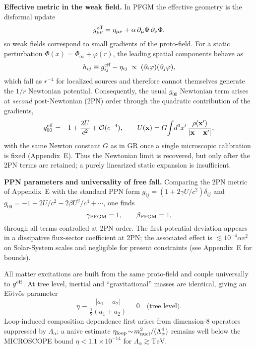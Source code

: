 \documentclass{article}
\begin{document}
\medskip
\noindent\textbf{Effective metric in the weak field.}
In PFGM the effective geometry is the disformal update
\begin{equation}
g^{\rm eff}_{\mu\nu} = \eta_{\mu\nu} + \alpha\,\partial_\mu\Phi\,\partial_\nu\Phi ,
\label{eq:weak_geff_again}
\end{equation}
so weak fields correspond to small gradients of the proto-field. For a static perturbation $\Phi(x)=\Phi_\infty+\varphi(r)$, the leading spatial components behave as
\begin{equation}
h_{ij} \equiv g^{\rm eff}_{ij}-\eta_{ij} \;\propto\; (\partial_i\varphi)(\partial_j\varphi),
\label{eq:hij_weak}
\end{equation}
which fall as $r^{-4}$ for localized sources and therefore cannot themselves generate the $1/r$ Newtonian potential. Consequently, the usual $g_{00}$ Newtonian term arises at \emph{second} post-Newtonian (2PN) order through the quadratic contribution of the gradients,
\begin{equation}
g^{\rm eff}_{00} = -1 + \frac{2U}{c^2} + \mathcal{O}(c^{-4}),
\qquad
U(\mathbf{x}) = G \!\int\! d^3x'\,\frac{\rho(\mathbf{x}')}{|\mathbf{x}-\mathbf{x}'|},
\label{eq:g00_Newtonian}
\end{equation}
with the same Newton constant $G$ as in GR once a single microscopic calibration is fixed (Appendix~E). Thus the Newtonian limit is recovered, but only after the 2PN terms are retained; a purely linearized static expansion is insufficient.

\medskip
\noindent\textbf{PPN parameters and universality of free fall.}
Comparing the 2PN metric of Appendix~E with the standard PPN form $g_{ij}=(1+2\gamma U/c^2)\delta_{ij}$ and $g_{00}=-1+2U/c^2 - 2\beta U^2/c^4 + \cdots$, one finds
\begin{equation}
\gamma_{\rm PFGM} = 1, \qquad \beta_{\rm PFGM} = 1,
\label{eq:PPN_equal_one}
\end{equation}
through all terms controlled at 2PN order. The first potential deviation appears in a dissipative flux-sector coefficient at 2PN; the associated effect is $\lesssim\!10^{-4}\alpha v^2$ on Solar-System scales and negligible for present constraints (see Appendix~E for bounds).

All matter excitations are built from the same proto-field and couple universally to $g^{\rm eff}$. At tree level, inertial and “gravitational” masses are identical, giving an Eötvös parameter
\begin{equation}
\eta \equiv \frac{|a_1-a_2|}{\tfrac12(a_1+a_2)} = 0 \quad \text{(tree level)}.
\label{eq:EP_tree}
\end{equation}
Loop-induced composition dependence first arises from dimension-8 operators suppressed by $\Lambda_\alpha$; a naive estimate $\eta_{\rm loop}\!\sim\! m_{\rm nucl}^2/(\Lambda_\alpha^4)$ remains well below the MICROSCOPE bound $\eta<1.1\times10^{-14}$ for $\Lambda_\alpha\gtrsim\!\text{TeV}$.
\end{document}
